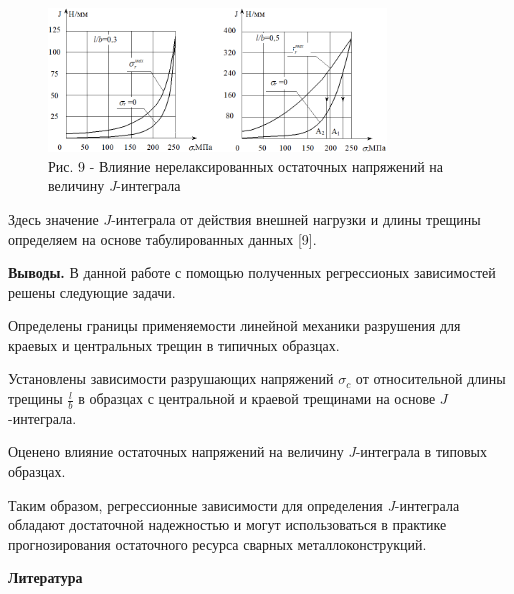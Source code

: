 \begin{figure}[H]
	\centering
	\includegraphics[width=0.8\textwidth]{assets/1245}
	\caption*{Рис. 9 - Влияние нерелаксированных остаточных напряжений на величину \emph{J}-интеграла}
\end{figure}

Здесь значение $J$-интеграла
от действия внешней нагрузки и длины трещины определяем на основе
табулированных данных {[}9{]}.

{\bfseries Выводы.} В данной работе с помощью полученных регрессионых
зависимостей решены следующие задачи.

Определены границы применяемости линейной механики разрушения для
краевых и центральных трещин в типичных образцах.

Установлены зависимости разрушающих напряжений
$\sigma_{c}$ от относительной длины трещины
$\frac{l}{b}$ в образцах с центральной и краевой
трещинами на основе $J$-интеграла.

Оценено влияние остаточных напряжений на величину \emph{J}-интеграла в
типовых образцах.

Таким образом, регрессионные зависимости для определения
\emph{J}-интеграла обладают достаточной надежностью и могут
использоваться в практике прогнозирования остаточного ресурса сварных
металлоконструкций.

\begin{center}
{\bfseries Литература}
\end{center}

